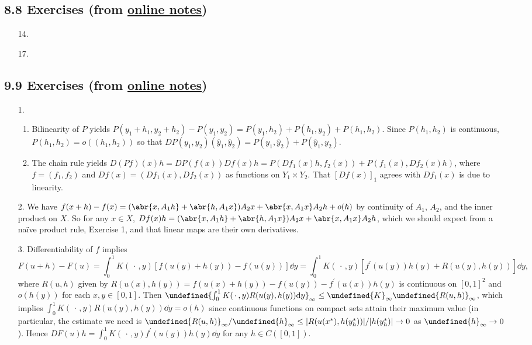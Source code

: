 \documentclass[11pt,leqno]{article}
\theoremstyle{plain}
\theoremstyle{definition}
\numberwithin{equation}{section}
\numberwithin{lem}{section}
\let\norm\undefined %
\DeclarePairedDelimiter\norm{\lVert}{\rVert}
\begin{document}
\subsection*{8.8 Exercises (from \href{https://users.oden.utexas.edu/~arbogast/appMath08c.pdf}{online notes})}
\begin{enumerate}
    \item[14.] 
    \item[17.] 
\end{enumerate}
\subsection*{9.9 Exercises (from \href{https://users.oden.utexas.edu/~arbogast/appMath08c.pdf}{online notes})}
\begin{enumerate}
    \item[1.] 
    \begin{enumerate}
        \item Bilinearity of $P$ yields $P(y_1+h_1, y_2 + h_2) - P(y_1,y_2) = P(y_1,h_2) + P(h_1,y_2) + P(h_1,h_2)$. Since $P(h_1,h_2)$ is continuous, $P(h_1,h_2) = o((h_1,h_2))$ so that $DP(y_1,y_2)(\hat y_1,\hat y_2) = P(y_1,\hat y_2) + P(\hat y_1,y_2)$.
        \item The chain rule yields $D(Pf)(x)h = DP(f(x))Df(x)h = P(Df_1(x)h, f_2(x)) + P(f_1(x),Df_2(x)h)$, where $f = (f_1,f_2)$ and $Df(x) = (Df_1(x),Df_2(x))$ as functions on $Y_1\times Y_2$. That $[Df(x)]_1$ agrees with $Df_1(x)$ is due to linearity.
    \end{enumerate}
    \item[2.] We have $f(x+h) - f(x) = (\abr{x,A_1h} + \abr{h,A_1x})A_2x + \abr{x,A_1x}A_2h + o(h)$ by continuity of $A_1$, $A_2$, and the inner product on $X$. So for any $x\in X$, $Df(x)h = (\abr{x,A_1h} + \abr{h,A_1x})A_2x + \abr{x,A_1x}A_2h$, which we should expect from a na\"ive product rule, Exercise 1, and that linear maps are their own derivatives.
    \item[3.] Differentiability of $f$ implies 
    \[F(u+h) - F(u) = \int_0^1K(\,\cdot\, ,y)[f(u(y) + h(y)) - f(u(y))]\dd y = \int_0^1K(\,\cdot\, ,y)[f^\prime(u(y))h(y) + R(u(y), h(y))]\dd y,\]
    where $R(u,h)$ given by $R(u(x), h(y)) = f(u(x) + h(y)) - f(u(y)) - f^\prime(u(x))h(y)$ is continuous on $[0,1]^2$ and $o(h(y))$ for each $x,y\in [0,1]$. Then $\norm{\int_0^1K(\,\cdot\, ,y)R(u(y), h(y))\dd y}_\infty\leq \norm{K}_\infty\norm{R(u,h)}_\infty$, which implies $\int_0^1K(\,\cdot\, ,y)R(u(y), h(y))\dd y = o(h)$ since continuous functions on compact sets attain their maximum value (in particular, the estimate we need is $\norm{R(u,h)}_\infty/\norm{h}_\infty\leq \abs{R(u(x^\ast),h(y^\ast_h))}/\abs{h(y^\ast_h)}\to 0$ as $\norm{h}_\infty\to 0$). Hence $DF(u)h = \int_0^1K(\,\cdot\, ,y)f^\prime(u(y))h(y)\dd y$ for any $h\in C([0,1])$.


\end{enumerate}
\end{document}
